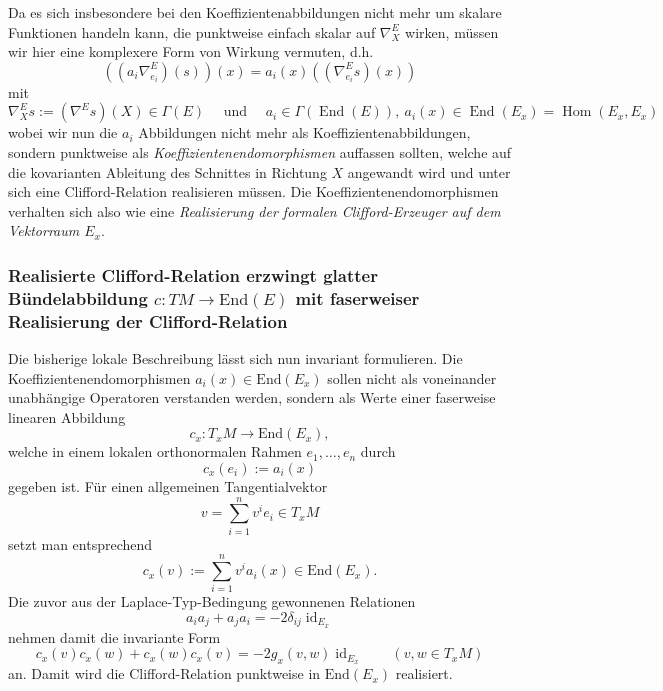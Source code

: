 \documentclass[10pt, letterpaper]{article}
\newcommand{\id}{\operatorname{id}}
\newcommand{\End}{\mathrm{End}}
\begin{document}
Da es sich insbesondere bei den Koeffizientenabbildungen nicht mehr um skalare Funktionen handeln kann, die punktweise einfach skalar auf $\nabla^E_{X}$ wirken, müssen wir hier eine komplexere Form von Wirkung vermuten, d.h.
$$\left(\left(a_i \nabla^E_{e_i}\right)(s)\right)(x)=a_i(x)\left(\left(\nabla^E_{e_i} s\right)(x)\right)$$
mit 
$$\nabla^E_X s:=(\nabla^E s)(X)\in\Gamma(E)\quad \text{ und }\quad  a_i \in \Gamma( \operatorname{End}(E)),\ a_i(x) \in \operatorname{End}\left(E_x\right)=\operatorname{Hom}\left(E_x, E_x\right) $$
wobei wir nun die $a_i$ Abbildungen nicht mehr als Koeffizientenabbildungen, sondern punktweise als \emph{Koeffizientenendomorphismen} auffassen sollten, welche auf die kovarianten Ableitung des Schnittes in Richtung $X$ angewandt wird und unter sich eine Clifford-Relation realisieren müssen. Die Koeffizientenendomorphismen verhalten sich also wie eine \emph{Realisierung der formalen Clifford-Erzeuger auf dem Vektorraum $E_x$}.

\subsubsection{Realisierte Clifford-Relation erzwingt glatter Bündelabbildung $c:TM\longrightarrow \End(E)$ mit faserweiser Realisierung der Clifford-Relation}


Die bisherige lokale Beschreibung lässt sich nun invariant formulieren. Die Koeffizientenendomorphismen \(a_i(x)\in \End(E_x)\) sollen nicht als voneinander unabhängige Operatoren verstanden werden, sondern als Werte einer faserweise linearen Abbildung
\[
c_x:T_xM\longrightarrow \End(E_x),
\]
welche in einem lokalen orthonormalen Rahmen \(e_1,\dots,e_n\) durch
\[
c_x(e_i):=a_i(x)
\]
gegeben ist. Für einen allgemeinen Tangentialvektor
\[
v=\sum_{i=1}^n v^i e_i\in T_xM
\]
setzt man entsprechend
\[
c_x(v):=\sum_{i=1}^n v^i a_i(x)\in \End(E_x).
\]
Die zuvor aus der Laplace-Typ-Bedingung gewonnenen Relationen
\[
a_i a_j+a_j a_i=-2\delta_{ij}\id_{E_x}
\]
nehmen damit die invariante Form
\[
c_x(v)c_x(w)+c_x(w)c_x(v)=-2g_x(v,w)\id_{E_x}
\qquad (v,w\in T_xM)
\]
an. Damit wird die Clifford-Relation punktweise in \(\End(E_x)\) realisiert.
\end{document}
